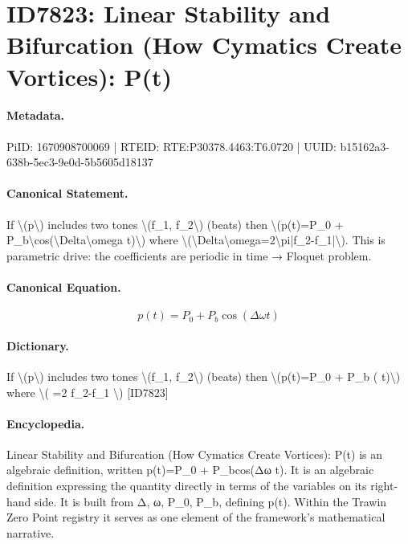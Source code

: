 \section*{ID7823: Linear Stability and Bifurcation (How Cymatics Create Vortices): P(t)}
\paragraph{Metadata.}
PiID: 1670908700069 | RTEID: RTE:P30378.4463:T6.0720 | UUID: b15162a3-638b-5ec3-9e0d-5b5605d18137

\paragraph{Canonical Statement.}
If \textbackslash{}(p\textbackslash{}) includes two tones \textbackslash{}(f\_1, f\_2\textbackslash{}) (beats) then \textbackslash{}(p(t)=P\_0 + P\_b\textbackslash{}cos(\textbackslash{}Delta\textbackslash{}omega t)\textbackslash{}) where \textbackslash{}(\textbackslash{}Delta\textbackslash{}omega=2\textbackslash{}pi|f\_2-f\_1|\textbackslash{}). This is parametric drive: the coefficients are periodic in time → Floquet problem.

\paragraph{Canonical Equation.}
\[
p(t)=P_0 + P_b\cos(\Delta\omega t)
\]

\paragraph{Dictionary.}
If \textbackslash{}(p\textbackslash{}) includes two tones \textbackslash{}(f\_1, f\_2\textbackslash{}) (beats) then \textbackslash{}(p(t)=P\_0 + P\_b ( t)\textbackslash{}) where \textbackslash{}( =2 f\_2-f\_1 \textbackslash{}) [ID7823]

\paragraph{Encyclopedia.}
Linear Stability and Bifurcation (How Cymatics Create Vortices): P(t) is an algebraic definition, written p(t)=P\_0 + P\_bcos(Δω t). It is an algebraic definition expressing the quantity directly in terms of the variables on its right-hand side. It is built from Δ, ω, P\_0, P\_b, defining p(t). Within the Trawin Zero Point registry it serves as one element of the framework's mathematical narrative.
